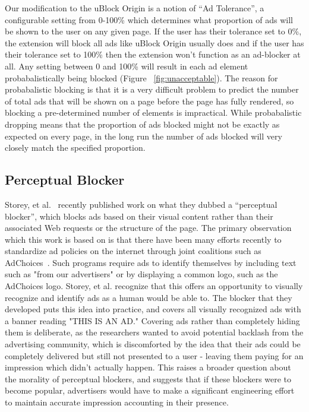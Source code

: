 Our modification to the uBlock Origin is a notion of ``Ad Tolerance'', a configurable setting from 0-100\% which determines what proportion of ads will be shown to the user on any given page.
If the user has their tolerance set to 0\%, the extension will block all ads like uBlock Origin usually does and if the user has their tolerance set to 100\% then the extension won't function as an ad-blocker at all.
Any setting between 0 and 100\% will result in each ad element probabalistically being blocked (Figure ~\ref{fig:unacceptable}).
The reason for probabalistic blocking is that it is a very difficult problem to predict the number of total ads that will be shown on a page before the page has fully rendered, so blocking a pre-determined number of elements is impractical.
While probabalistic dropping means that the proportion of ads blocked might not be exactly as expected on every page, in the long run the number of ads blocked will very closely match the specified proportion.

\subsection{Perceptual Blocker}
Storey, et al.~\cite{storey2016future} recently published work on what they dubbed a ``perceptual blocker'', which blocks ads based on their visual content rather than their associated Web requests or the structure of the page.
The primary observation which this work is based on is that there have been many efforts recently to standardize ad policies on the internet through joint coalitions such as AdChoices~\cite{adchoices}.
Such programs require ads to identify themselves by including text such as "from our advertisers" or by displaying a common logo, such as the AdChoices logo.
Storey, et al. recognize that this offers an opportunity to visually recognize and identify ads as a human would be able to.
The blocker that they developed puts this idea into practice, and covers all visually recognized ads with a banner reading "THIS IS AN AD."
Covering ads rather than completely hiding them is deliberate, as the researchers wanted to avoid potential backlash from the advertising community, which is discomforted by the idea that their ads could be completely delivered but still not presented to a user - leaving them paying for an impression which didn't actually happen.
This raises a broader question about the morality of perceptual blockers, and suggests that if these blockers were to become popular, advertisers would have to make a significant engineering effort to maintain accurate impression accounting in their presence.

